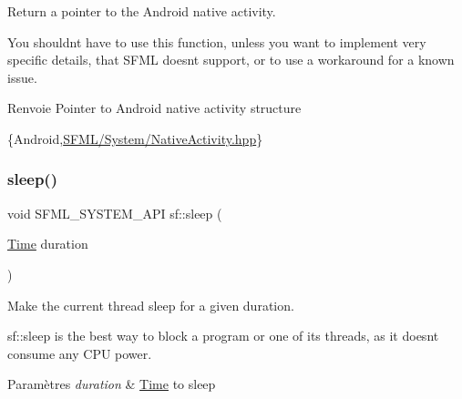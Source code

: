 Return a pointer to the Android native activity. 

You shouldn\textquotesingle{}t have to use this function, unless you want to implement very specific details, that S\+F\+ML doesn\textquotesingle{}t support, or to use a workaround for a known issue.

\begin{DoxyReturn}{Renvoie}
Pointer to Android native activity structure
\end{DoxyReturn}
\{Android,\hyperlink{NativeActivity_8hpp_source}{S\+F\+M\+L/\+System/\+Native\+Activity.\+hpp}\} \mbox{\label{group__system_ga2f2620831533dee0ed432ed982342e09}} 
\subsubsection{\texorpdfstring{sleep()}{sleep()}}
{\footnotesize\ttfamily void S\+F\+M\+L\+\_\+\+S\+Y\+S\+T\+E\+M\+\_\+\+A\+PI sf\+::sleep (\begin{DoxyParamCaption}\item[{\hyperlink{classsf_1_1Time}{Time}}]{duration }\end{DoxyParamCaption})}



Make the current thread sleep for a given duration. 

sf\+::sleep is the best way to block a program or one of its threads, as it doesn\textquotesingle{}t consume any C\+PU power.


\begin{DoxyParams}{Paramètres}
{\em duration} & \hyperlink{classsf_1_1Time}{Time} to sleep \\
\hline
\end{DoxyParams}
